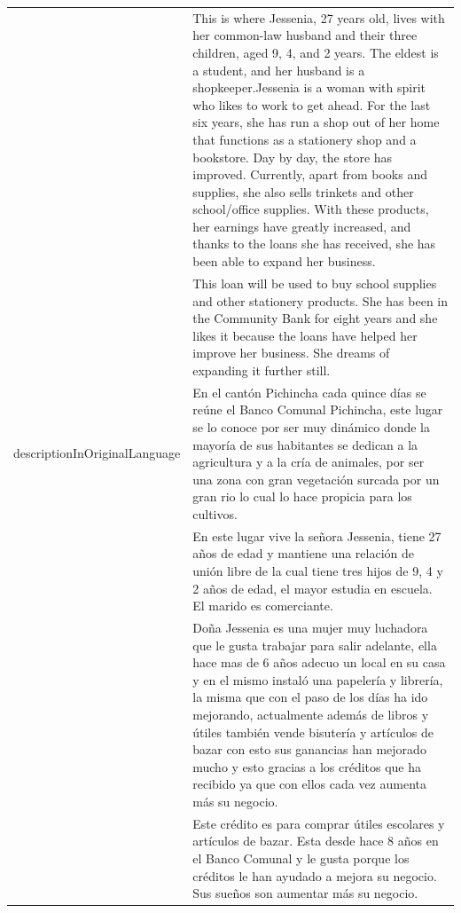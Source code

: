\begin{longtable}{|p{}|p{}|}
	                                                & This is where Jessenia, 27 years old, lives with her common-law
	husband and their three children, aged 9, 4, and 2 years. The eldest is
	a student, and her husband is a shopkeeper.Jessenia is a woman with
	spirit who likes to work to get ahead. For the last six years, she has
	run a shop out of her home that functions as a stationery shop and a
	bookstore. Day by day, the store has improved. Currently, apart from
	books and supplies, she also sells trinkets and other school/office
	supplies. With these products, her earnings have greatly increased, and
	thanks to the loans she has received, she has been able to expand her
	business.                                                                                                             \\
	                                                & This loan will be used to buy school supplies and other stationery
	products. She has been in the Community Bank for eight years and she
	likes it because the loans have helped her improve her business. She
	dreams of expanding it further still.                                                                                 \\
	descriptionInOriginalLanguage                   & En el cantón Pichincha cada quince días
	se reúne el Banco Comunal Pichincha, este lugar se lo conoce por ser muy
	dinámico donde la mayoría de sus habitantes se dedican a la agricultura
	y a la cría de animales, por ser una zona con gran vegetación surcada
	por un gran rio lo cual lo hace propicia para los cultivos.                                                           \\
	                                                & En este lugar vive la señora Jessenia, tiene 27 años de edad y
	mantiene una relación de unión libre de la cual tiene tres hijos de 9, 4
	y 2 años de edad, el mayor estudia en escuela. El marido es
	comerciante.                                                                                                          \\
	                                                & Doña Jessenia es una mujer muy luchadora que le gusta trabajar para
	salir adelante, ella hace mas de 6 años adecuo un local en su casa y en
	el mismo instaló una papelería y librería, la misma que con el paso de
	los días ha ido mejorando, actualmente además de libros y útiles también
	vende bisutería y artículos de bazar con esto sus ganancias han mejorado
	mucho y esto gracias a los créditos que ha recibido ya que con ellos
	cada vez aumenta más su negocio.                                                                                      \\
	                                                & Este crédito es para comprar útiles escolares y artículos de bazar.
	Esta desde hace 8 años en el Banco Comunal y le gusta porque los
	créditos le han ayudado a mejora su negocio. Sus sueños son aumentar más
	su negocio.                                                                                                           \\
\end{longtable}

